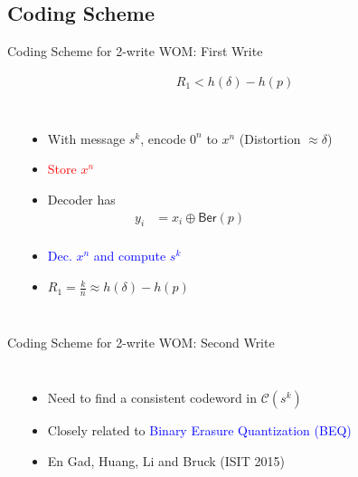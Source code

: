 \documentclass[10pt,presentation]{beamer}
\def\WOM_path{../compound-codes/WOM/slides/Figures}
\begin{document}
\subsection{Coding Scheme}
\begin{frame}{Coding Scheme for 2-write WOM: First Write}
  \vspace{-2cm}
  \begin{center}
    \begin{align*}
      R_1 < h(\delta) - h(p)
    \end{align*}
  \end{center}
  \vspace{-0.5cm}
  \begin{columns}
    \begin{center}
      \scalebox{0.5}{}
    \end{center}

    \begin{itemize}
    \item<1-> With message $s^k$, encode $0^n$ to $x^n$ (Distortion $\approx \delta$)
    \item<1-> \textcolor{red}{Store $x^n$}
    \item<2-> Decoder has
      \small{
        \begin{align*}
          y_i&=x_i \oplus \mathsf{Ber}(p) \\
        \end{align*}
      }
    \vspace{-1.25cm}
    \item <3-> \textcolor{blue}{Dec. $x^n$ and compute $s^k$}
    \item <3-> $R_1=\tfrac{k}{n}\approx h(\delta)-h(p)$
    \end{itemize}
  \end{columns}
\end{frame}

\begin{frame}{Coding Scheme for 2-write WOM: Second Write}
  \begin{center}
    \scalebox{0.5}{}    
  \end{center}
  \begin{columns}
    \begin{center}
      \scalebox{0.55}{}
    \end{center}
    \begin{itemize}
    \item Need to find a \alert{consistent} codeword in $\mathcal{C}(s^k)$
    \item<2-> Closely related to \textcolor{blue}{Binary Erasure Quantization (BEQ)}
    \item<2-> En Gad, Huang, Li and Bruck (ISIT 2015)
    \end{itemize}
  \end{columns}
\end{frame}
\end{document}
